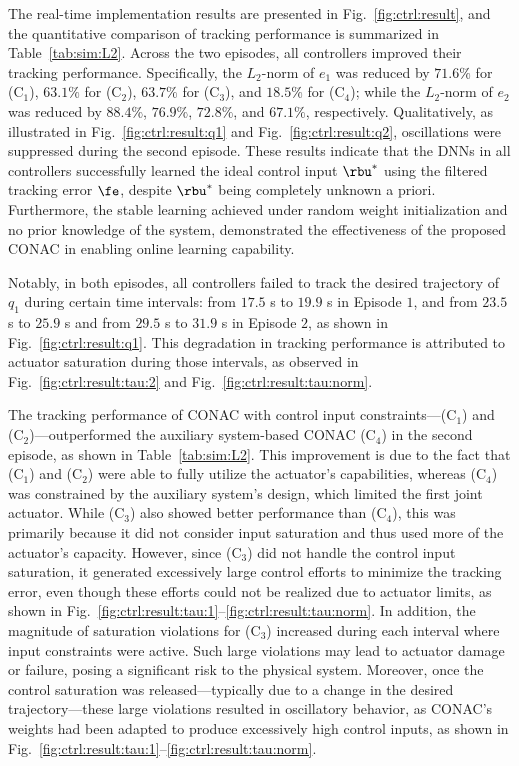 \documentclass[journal]{IEEEtran}
\begin{document}
The real-time implementation results are presented in Fig.~\ref{fig:ctrl:result}, and the quantitative comparison of tracking performance is summarized in Table~\ref{tab:sim:L2}.
Across the two episodes, all controllers improved their tracking performance. 
Specifically, the $L_2$-norm of $e_1$ was reduced by $71.6 \%$ for (C$_1$), $63.1 \%$ for (C$_2$), $63.7 \%$ for (C$_3$), and $18.5 \%$ for (C$_4$); while the $L_2$-norm of $e_2$ was reduced by $88.4 \%$, $76.9 \%$, $72.8 \%$, and $67.1 \%$, respectively.
Qualitatively, as illustrated in Fig.~\ref{fig:ctrl:result:q1} and Fig.~\ref{fig:ctrl:result:q2}, oscillations were suppressed during the second episode.
These results indicate that the DNNs in all controllers successfully learned the ideal control input $\rbu^*$ using the filtered tracking error $\fe$, despite $\rbu^*$ being completely unknown a priori.
Furthermore, the stable learning achieved under random weight initialization and no prior knowledge of the system, demonstrated the effectiveness of the proposed CONAC in enabling online learning capability.

Notably, in both episodes, all controllers failed to track the desired trajectory of $q_1$ during certain time intervals: from $17.5$ s to $19.9$ s in Episode $1$, and from $23.5$ s to $25.9$ s and from $29.5$ s to $31.9$ s in Episode $2$, as shown in Fig.~\ref{fig:ctrl:result:q1}.
This degradation in tracking performance is attributed to actuator saturation during those intervals, as observed in Fig.~\ref{fig:ctrl:result:tau:2} and Fig.~\ref{fig:ctrl:result:tau:norm}.

The tracking performance of CONAC with control input constraints—\ie (C$_1$) and (C$_2$)—outperformed the auxiliary system-based CONAC (C$_4$) in the second episode, as shown in Table~\ref{tab:sim:L2}.
This improvement is due to the fact that (C$_1$) and (C$_2$) were able to fully utilize the actuator's capabilities, whereas (C$_4$) was constrained by the auxiliary system's design, which limited the first joint actuator.
While (C$_3$) also showed better performance than (C$_4$), this was primarily because it did not consider input saturation and thus used more of the actuator's capacity.
However, since (C$_3$) did not handle the control input saturation, it generated excessively large control efforts to minimize the tracking error, even though these efforts could not be realized due to actuator limits, as shown in Fig.~\ref{fig:ctrl:result:tau:1}–\ref{fig:ctrl:result:tau:norm}.
In addition, the magnitude of saturation violations for (C$_3$) increased during each interval where input constraints were active.
Such large violations may lead to actuator damage or failure, posing a significant risk to the physical system.
Moreover, once the control saturation was released—typically due to a change in the desired trajectory—these large violations resulted in oscillatory behavior, as CONAC's weights had been adapted to produce excessively high control inputs, as shown in Fig.~\ref{fig:ctrl:result:tau:1}–\ref{fig:ctrl:result:tau:norm}.
\end{document}
